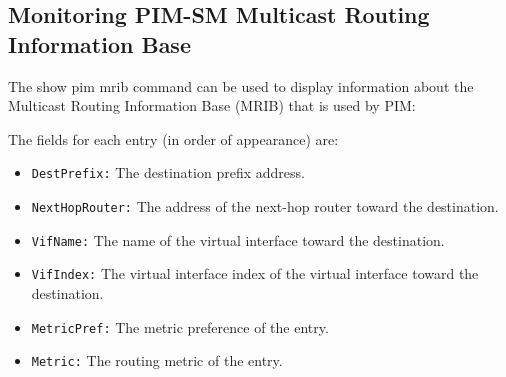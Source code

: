 \subsection{Monitoring PIM-SM Multicast Routing Information Base}

The {\stt show pim mrib} command can be used to display
information about the Multicast Routing Information Base (MRIB) that is used
by PIM:

\vspace{0.1in}
\noindent{}
\vspace{0.1in}

The fields for each entry (in order of appearance) are:
\begin{itemize}

  \item {\tt DestPrefix:} The destination prefix address.

  \item {\tt NextHopRouter:} The address of the next-hop router toward the
  destination.

  \item {\tt VifName:} The name of the virtual interface toward the
  destination.

  \item {\tt VifIndex:} The virtual interface index of the virtual interface
  toward the destination.

  \item {\tt MetricPref:} The metric preference of the entry.

  \item {\tt Metric:} The routing metric of the entry.

\end{itemize}


